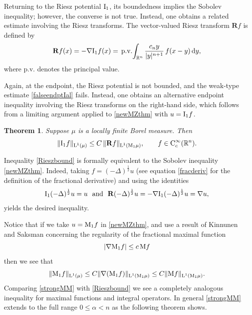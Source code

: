 \documentclass[11pt, a4paper, reqno]{amsart}
\newcommand{\R}{\mathbb R}
\newcommand{\al}{\alpha}
\newcommand{\Lup}{\textup{L}}
\newcommand{\Con}{\textup{C}}
\newtheorem{theorem}{Theorem}[section]
\theoremstyle{definition}
\theoremstyle{remark}
\begin{document}
Returning to the Riesz potential $\textup{I}_1$, its boundedness implies the Sobolev inequality; however, the converse is not true. Instead, one obtains a related estimate involving the Riesz transforms. The vector-valued Riesz transform $\mathbf{R}f$ is defined by
\[
\mathbf{R}f(x)
= -\nabla \textup{I}_1 f(x)
= \,\textup{p.v.}\!\int_{\R^n} \frac{c_ny}{|y|^{n+1}}\, f(x-y)\,\mathrm{d}y,
\]
where $\mathrm{p.v.}$ denotes the principal value.

Again, at the endpoint, the Riesz potential is not bounded, and the weak-type estimate \eqref{falseendptIal} fails. Instead, one obtains an alternative endpoint inequality involving the Riesz transforms on the right-hand side, which follows from a limiting argument applied to \eqref{newMZthm} with $u=\textup{I}_1 f$.

\begin{theorem}\label{RieszRieszThm}
Suppose $\mu$ is a locally finite Borel measure. Then
\begin{equation}\label{Rieszbound}
\|\textup{I}_1 f\|_{\Lup^1(\mu)}
\le C\,\|\mathbf{R}f\|_{\Lup^1(\textup{M}_1\mu)},
\qquad f \in \Con_c^\infty(\R^n).
\end{equation}
\end{theorem}
Inequality \eqref{Rieszbound} is formally equivalent to the Sobolev inequality \eqref{newMZthm}. Indeed, taking $f = (-\Delta)^{\frac12} u$ (see equation \eqref{fracderiv} for the definition of the fractional derivative) and using the identities
\[
\textup{I}_1 (-\Delta)^{\frac12} u = u
\ \ \text{and} \ \
\mathbf{R} (-\Delta)^{\frac12} u
= -\nabla \textup{I}_1 (-\Delta)^{\frac12} u
= \nabla u,
\]
yields the desired inequality.  

Notice that if we take $u=\textup{M}_1f$ in \eqref{newMZthm}, and use a result of Kinnunen and Saksman \cite{KinSak} concerning the regularity of the fractional maximal function 
$$|\nabla \textup{M}_1f|\leq c\,\textup{M}f$$
then we see that 
\begin{equation}\label{strongMM} 
\|\textup{M}_1f\|_{\Lup^1(\mu)}\leq C\|\nabla(\textup{M}_1f)\|_{\Lup^1(\textup{M}_1\mu)}\leq C\|\textup{M}f\|_{\Lup^1(\textup{M}_1\mu)}.\end{equation}
Comparing \eqref{strongMM} with \eqref{Rieszbound} we see a completely analogous inequality for maximal functions and integral operators.  In general \eqref{strongMM} extends to the full range $0\leq \al<n$ as the following theorem shows.
\end{document}
